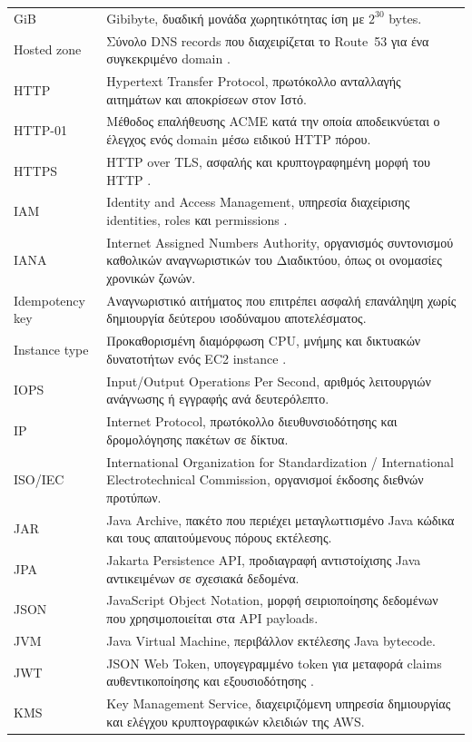 \documentclass[12pt,a4paper,twoside,fleqn]{book}
\begin{document}
\begin{longtable}{@{}p{3.8cm}p{9.2cm}@{}}
GiB & Gibibyte, δυαδική μονάδα χωρητικότητας ίση με $2^{30}$ bytes.\\
Hosted zone & Σύνολο DNS records που διαχειρίζεται το Route~53 για ένα συγκεκριμένο domain \cite{aws2026route53}.\\
HTTP & Hypertext Transfer Protocol, πρωτόκολλο ανταλλαγής αιτημάτων και αποκρίσεων στον Ιστό.\\
HTTP-01 & Μέθοδος επαλήθευσης ACME κατά την οποία αποδεικνύεται ο έλεγχος ενός domain μέσω ειδικού HTTP πόρου.\\
HTTPS & HTTP over TLS, ασφαλής και κρυπτογραφημένη μορφή του HTTP \cite{rfc8446}.\\
IAM & Identity and Access Management, υπηρεσία διαχείρισης identities, roles και permissions \cite{aws2026iam}.\\
IANA & Internet Assigned Numbers Authority, οργανισμός συντονισμού καθολικών αναγνωριστικών του Διαδικτύου, όπως οι ονομασίες χρονικών ζωνών.\\
Idempotency key & Αναγνωριστικό αιτήματος που επιτρέπει ασφαλή επανάληψη χωρίς δημιουργία δεύτερου ισοδύναμου αποτελέσματος.\\
Instance type & Προκαθορισμένη διαμόρφωση CPU, μνήμης και δικτυακών δυνατοτήτων ενός EC2 instance \cite{aws2026ec2}.\\
IOPS & Input/Output Operations Per Second, αριθμός λειτουργιών ανάγνωσης ή εγγραφής ανά δευτερόλεπτο.\\
IP & Internet Protocol, πρωτόκολλο διευθυνσιοδότησης και δρομολόγησης πακέτων σε δίκτυα.\\
ISO/IEC & International Organization for Standardization / International Electrotechnical Commission, οργανισμοί έκδοσης διεθνών προτύπων.\\
JAR & Java Archive, πακέτο που περιέχει μεταγλωττισμένο Java κώδικα και τους απαιτούμενους πόρους εκτέλεσης.\\
JPA & Jakarta Persistence API, προδιαγραφή αντιστοίχισης Java αντικειμένων σε σχεσιακά δεδομένα.\\
JSON & JavaScript Object Notation, μορφή σειριοποίησης δεδομένων που χρησιμοποιείται στα API payloads.\\
JVM & Java Virtual Machine, περιβάλλον εκτέλεσης Java bytecode.\\
JWT & JSON Web Token, υπογεγραμμένο token για μεταφορά claims αυθεντικοποίησης και εξουσιοδότησης \cite{rfc7519}.\\
KMS & Key Management Service, διαχειριζόμενη υπηρεσία δημιουργίας και ελέγχου κρυπτογραφικών κλειδιών της AWS.\\

\end{longtable}
\end{document}
